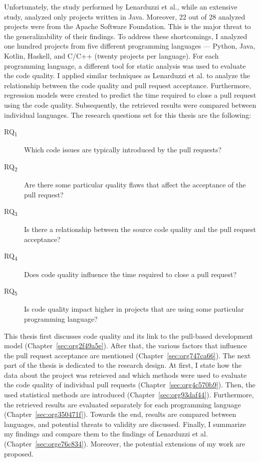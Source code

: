 \documentclass[digital,oneside,oldtable,nolof,nolot,nocover]{fithesis4}
\begin{document}
Unfortunately, the study performed by Lenarduzzi et al., while an extensive
study, analyzed only projects written in Java. Moreover, 22 out of 28 analyzed
projects were from the Apache Software Foundation. This is the major threat to
the generalizability of their findings. To address these shortcomings, I
analyzed one hundred projects from five different programming languages ---
Python, Java, Kotlin, Haskell, and C/C++ (twenty projects per language). For
each programming language, a different tool for static analysis was used to
evaluate the code quality. I applied similar techniques as Lenarduzzi et
al. to analyze the relationship between the code quality and pull request
acceptance. Furthermore, regression models were created to predict the
time required to close a pull request using the code quality. Subsequently,
the retrieved results were compared between individual languages.
\newpage{}
\noindent{}The research questions set for this thesis are the following:
\begin{description}
\item[{RQ\textsubscript{1}}] Which code issues are typically introduced by the pull requests?
\item[{RQ\textsubscript{2}}] Are there some particular quality flaws that affect the acceptance of the pull request?
\item[{RQ\textsubscript{3}}] Is there a relationship between the source code quality and the pull request acceptance?
\item[{RQ\textsubscript{4}}] Does code quality influence the time required to close a pull request?
\item[{RQ\textsubscript{5}}] Is code quality impact higher in projects that are using some particular programming language?
\end{description}

This thesis first discusses code quality and its link to the pull-based
development model (Chapter~\ref{sec:org2f49a5e}).
After that, the various factors that influence the pull request acceptance are
mentioned (Chapter~\ref{sec:org747ca66}). The next part of the thesis
is dedicated to the research design. At first, I state how the data about the
project was retrieved and which methods were used to evaluate the code quality
of individual pull requests (Chapter~\ref{sec:org4c570b9}). Then, the used
statistical methods are introduced (Chapter~\ref{sec:org93daf44}). Furthermore,
the retrieved results are evaluated separately for each programming language
(Chapter~\ref{sec:org350471f}). Towards the end, results are compared between
languages, and potential threats to validity are discussed. Finally, I
summarize my findings and compare them to the findings of Lenarduzzi et al.
(Chapter~\ref{sec:orge76c834}). Moreover, the potential extensions of my work are
proposed.
\end{document}
